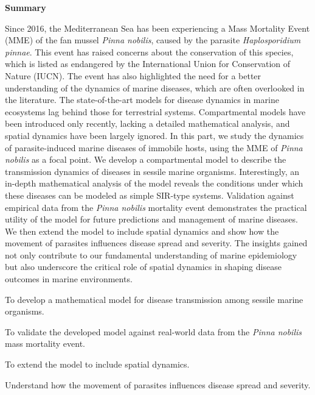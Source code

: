 \thispagestyle{empty}

\begin{center}
  \textbf{\Large Summary}
\end{center}

Since 2016, the Mediterranean Sea has been experiencing a Mass Mortality Event
(MME) of the fan mussel \textit{Pinna nobilis}, caused by the
parasite \textit{Haplosporidium pinnae}. This event has raised concerns about
the conservation of this species, which is listed as endangered by the
International Union for Conservation of Nature (IUCN). The event has also
highlighted the need for a better understanding of the dynamics of marine
diseases, which are often overlooked in the literature. The state-of-the-art
models for disease dynamics in marine ecosystems lag behind those for
terrestrial systems. Compartmental models have been introduced only recently,
lacking a detailed mathematical analysis, and spatial dynamics have been
largely ignored. In this part, we study the dynamics of parasite-induced marine
diseases of immobile hosts, using the MME of \textit{Pinna nobilis} as a focal
point. We develop a compartmental model to describe the transmission dynamics
of diseases in sessile marine organisms. Interestingly, an in-depth
mathematical analysis of the model reveals the conditions under
which these diseases can be modeled as simple SIR-type systems. Validation
against empirical data from the \textit{Pinna nobilis} mortality event
demonstrates the practical utility of the model for future predictions
and management of marine diseases. We then extend the model to include spatial
dynamics and show how the movement of parasites influences disease spread and
severity. The insights gained not only contribute to our fundamental
understanding of marine epidemiology but also underscore the critical role of
spatial dynamics in shaping disease outcomes in marine environments.

\vspace{1cm}

\begin{objectiveslist}
  \item To develop a mathematical model for disease
  transmission among sessile marine organisms.
  \item To validate the developed model against real-world data from the
  \textit{Pinna nobilis} mass mortality event.
  \item To extend the model to include spatial dynamics.
  \item Understand how the movement of parasites influences disease spread and
  severity.
\end{objectiveslist}

